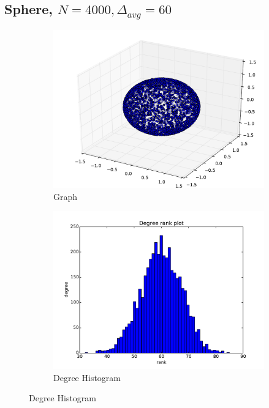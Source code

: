 \documentclass[oneside, titlepage]{scrartcl}
\begin{document}
\subsection{Sphere, $N=4000, \Delta_{avg}=60$}
\begin{figure}[!h]
\centering
\begin{subfigure}{0.5\textwidth}
	\centering
	\includegraphics[width=0.9\linewidth]{figures/graph8.pdf}
	\caption{Graph}
\end{subfigure}%
\begin{subfigure}{0.5\textwidth}
	\centering
	\includegraphics[width=0.9\linewidth]{figures/degrees8.pdf}
	\caption{Degree Histogram}
\end{subfigure}


\end{figure}
\end{document}
